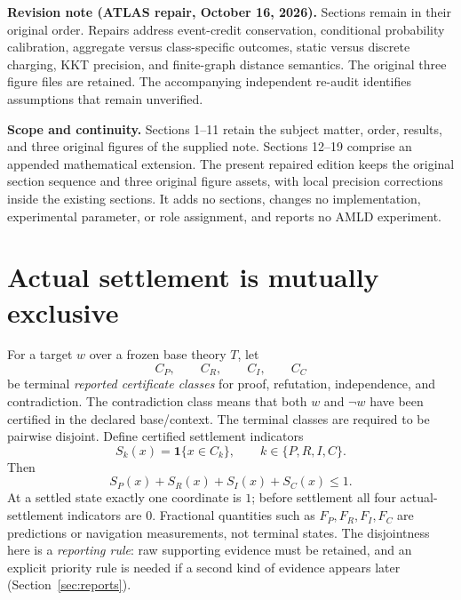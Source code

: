\documentclass[11pt]{article}
\newcommand{\ind}{\mathbf 1}
\begin{document}
\noindent\textbf{Revision note (ATLAS repair, October 16, 2026).} Sections remain in their original order. Repairs address event-credit conservation, conditional probability calibration, aggregate versus class-specific outcomes, static versus discrete charging, KKT precision, and finite-graph distance semantics. The original three figure files are retained. The accompanying independent re-audit identifies assumptions that remain unverified.\par

\noindent\textbf{Scope and continuity.} Sections 1--11 retain the subject matter, order, results, and three original figures of the supplied note. Sections 12--19 comprise an appended mathematical extension. The present repaired edition keeps the original section sequence and three original figure assets, with local precision corrections inside the existing sections. It adds no sections, changes no implementation, experimental parameter, or role assignment, and reports no AMLD experiment.

\section{Actual settlement is mutually exclusive}\label{sec:actual}
For a target $w$ over a frozen base theory $T$, let
\[
C_P,\qquad C_R,\qquad C_I,\qquad C_C
\]
be terminal \emph{reported certificate classes} for proof, refutation, independence, and contradiction. The contradiction class means that both $w$ and $\neg w$ have been certified in the declared base/context. The terminal classes are required to be pairwise disjoint. Define certified settlement indicators
\[
S_k(x)=\ind\{x\in C_k\},\qquad k\in\{P,R,I,C\}.
\]
Then
\[
S_P(x)+S_R(x)+S_I(x)+S_C(x)\leq 1.
\]
At a settled state exactly one coordinate is $1$; before settlement all four actual-settlement indicators are $0$. Fractional quantities such as $F_P,F_R,F_I,F_C$ are predictions or navigation measurements, not terminal states. The disjointness here is a \emph{reporting rule}: raw supporting evidence must be retained, and an explicit priority rule is needed if a second kind of evidence appears later (Section~\ref{sec:reports}).
\end{document}
